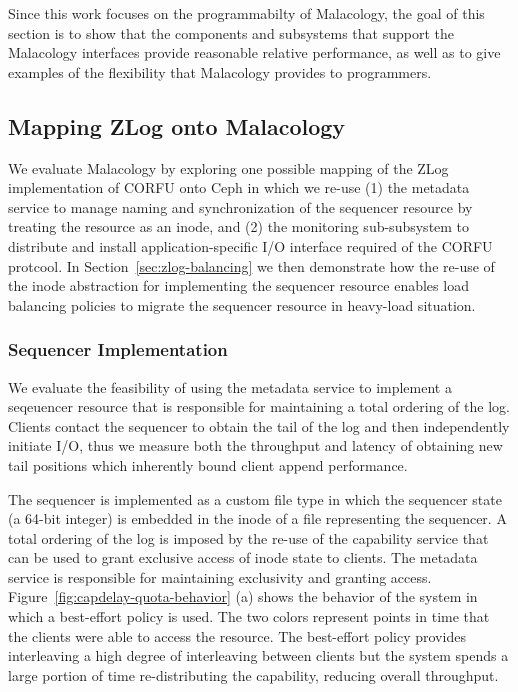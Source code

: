 \documentclass[preprint]{sigplanconf-eurosys}
\begin{document}

Since this work focuses on the programmabilty of Malacology, the goal of this
section is to show that the components and subsystems that support the
Malacology interfaces provide reasonable relative performance, as well as to
give examples of the flexibility that Malacology provides to programmers.


\subsection{Mapping ZLog onto Malacology}
\label{sec:mapping-zlog-onto-malacology}

We evaluate Malacology by exploring one possible mapping of the ZLog
implementation of CORFU onto Ceph in which we re-use (1) the metadata service
to manage naming and synchronization of the sequencer resource by treating the
resource as an inode, and (2) the monitoring sub-subsystem to distribute and
install application-specific I/O interface required of the CORFU protcool. In
Section~\ref{sec:zlog-balancing} we then demonstrate how the re-use of the inode
abstraction for implementing the sequencer resource enables load balancing policies
to migrate the sequencer resource in heavy-load situation.

\subsubsection{Sequencer Implementation}
\label{sec:sequencer-implementation}

We evaluate the feasibility of using the metadata service to implement a
seqeuencer resource that is responsible for maintaining a total ordering of
the log. Clients contact the sequencer to obtain the tail of the log and then
independently initiate I/O, thus we measure both the throughput and latency of
obtaining new tail positions which inherently bound client append performance.

The sequencer is implemented as a custom file type in which the sequencer
state (a 64-bit integer) is embedded in the inode of a file representing the
sequencer. A total ordering of the log is imposed by the re-use of the
capability service that can be used to grant exclusive access of inode state
to clients. The metadata service is responsible for maintaining exclusivity
and granting access. Figure~\ref{fig:capdelay-quota-behavior} (a) shows the
behavior of the system in which a best-effort policy is used.  The two colors
represent points in time that the clients were able to access the resource.
The best-effort policy provides interleaving a high degree of interleaving
between clients but the system spends a large portion of time re-distributing
the capability, reducing overall throughput.
\end{document}

